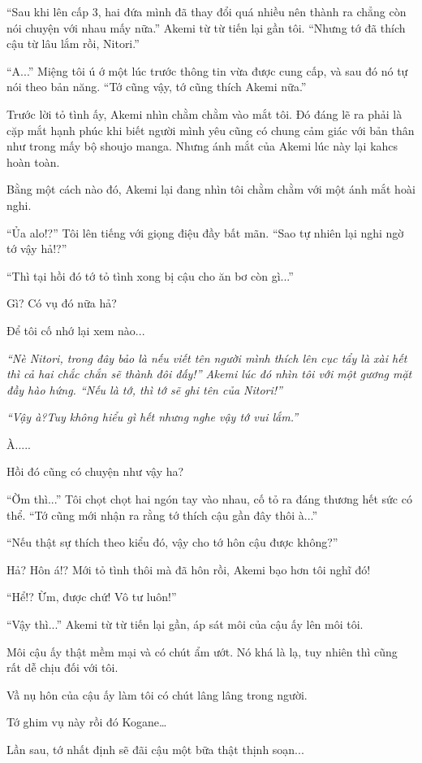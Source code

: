 {``Sau khi lên cấp 3, hai đứa mình đã thay đổi quá nhiều nên thành ra
chẳng còn nói chuyện với nhau mấy nữa.'' Akemi từ từ tiến lại gần tôi.
``Nhưng tớ đã thích cậu từ lâu lắm rồi, Nitori.''

``A...'' Miệng tôi ú ớ một lúc trước thông tin vừa được cung cấp, và sau
đó nó tự nói theo bản năng. ``Tớ cũng vậy, tớ cũng thích Akemi nữa.''

Trước lời tỏ tình ấy, Akemi nhìn chằm chằm vào mắt tôi. Đó đáng lẽ ra
phải là cặp mắt hạnh phúc khi biết người mình yêu cũng có chung cảm giác
với bản thân như trong mấy bộ shoujo manga. Nhưng ánh mắt của Akemi lúc
này lại kahcs hoàn toàn.

Bằng một cách nào đó, Akemi lại đang nhìn tôi chằm chằm với một ánh mắt
hoài nghi.

``Ủa alo!?'' Tôi lên tiếng với giọng điệu đầy bất mãn. ``Sao tự nhiên
lại nghi ngờ tớ vậy hả!?''

``Thì tại hồi đó tớ tỏ tình xong bị cậu cho ăn bơ còn gì...''

Gì? Có vụ đó nữa hả?

Để tôi cố nhớ lại xem nào...

\emph{``Nè Nitori, trong đây bảo là nếu viết tên người mình thích lên
    cục tẩy là xài hết thì cả hai chắc chắn sẽ thành đôi đấy!'' Akemi lúc đó
    nhìn tôi với một gương mặt đầy hào hứng. ``Nếu là tớ, thì tớ sẽ ghi tên
    của Nitori!''}

\emph{``Vậy à?Tuy không hiểu gì hết nhưng nghe vậy tớ vui lắm.''}

À.....

Hồi đó cũng có chuyện như vậy ha?

``Ờm thì...'' Tôi chọt chọt hai ngón tay vào nhau, cố tỏ ra đáng thương
hết sức có thể. ``Tớ cũng mới nhận ra rằng tớ thích cậu gần đây thôi
à...''

``Nếu thật sự thích theo kiểu đó, vậy cho tớ hôn cậu được không?''

Hả? Hôn á!? Mới tỏ tình thôi mà đã hôn rồi, Akemi bạo hơn tôi nghĩ đó!

``Hể!? Ừm, được chứ! Vô tư luôn!''

``Vậy thì...'' Akemi từ từ tiến lại gần, áp sát môi của cậu ấy lên môi
tôi.

Môi cậu ấy thật mềm mại và có chút ẩm ướt. Nó khá là lạ, tuy nhiên thì
cũng rất dễ chịu đối với tôi.

Vầ nụ hôn của cậu ấy làm tôi có chút lâng lâng trong người.

Tớ ghim vụ này rồi đó Kogane\ldots{}

Lần sau, tớ nhất định sẽ đãi cậu một bữa thật thịnh soạn...
}